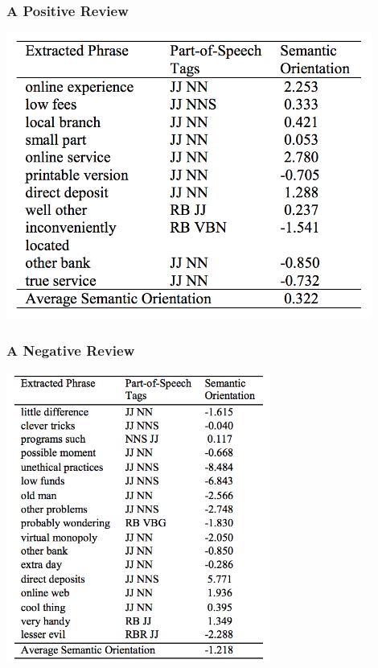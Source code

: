 \documentclass[t]{beamer}
\begin{document}
\begin{frame} \frametitle{A Positive Review}
\begin{center}
     \includegraphics[width=0.9\textwidth]{turney05}
\end{center}
\end{frame} 


\begin{frame} \frametitle{A Negative Review}

\begin{center}
     \includegraphics[width=0.65\textwidth]{turney06}
\end{center}
\end{frame} 
\end{document}
